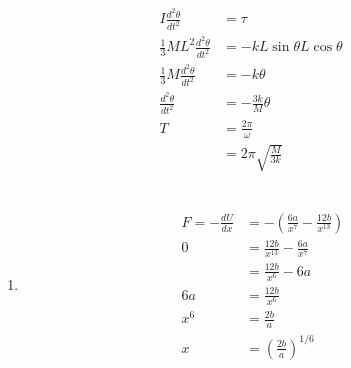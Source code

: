 \documentclass{article}
\begin{document}
\subsection{}

\begin{align*}
  I \frac{d^2 \theta}{d t^2}                 & = \tau                           \\
  \frac{1}{3} M L^2 \frac{d^2 \theta}{d t^2} & = -k L \sin \theta L \cos \theta \\
  \frac{1}{3} M \frac{d^2 \theta}{d t^2}     & = -k \theta                      \\
  \frac{d^2 \theta}{d t^2}                   & = -\frac{3 k}{M} \theta          \\
  T                                          & = \frac{2 \pi}{\omega}           \\
                                             & = 2 \pi \sqrt{\frac{M}{3 k}}     \\
\end{align*}

\subsection{}

\begin{enumerate}
  \item

        \begin{align*}
          F = -\frac{d U}{d x} & = -\left( \frac{6 a}{x^7} - \frac{12 b}{x^{13}} \right) \\
          0                    & = \frac{12 b}{x^{13}} - \frac{6 a}{x^7}                 \\
                               & = \frac{12 b}{x^6} - 6 a                                \\
          6 a                  & = \frac{12 b}{x^6}                                      \\
          x^6                  & = \frac{2 b}{a}                                         \\
          x                    & = \left( \frac{2 b}{a} \right)^{1 / 6}
        \end{align*}
\end{enumerate}

\subsection{}
\end{document}
